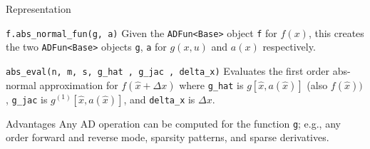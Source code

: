 \documentclass{beamer}
\begin{document}
\begin{frame}{Representation}

\begin{block}{ \texttt{f.abs\_normal\_fun(g, a)} }
Given the \texttt{ADFun<Base>} object \texttt{f} for $f(x)$,
this creates the two \texttt{ADFun<Base>} objects \texttt{g}, \texttt{a}
for $g(x, u)$ and $a(x)$ respectively.
\end{block}
\pause

\begin{block}{ \texttt{abs\_eval(n, m, s, g\_hat , g\_jac , delta\_x)} }
Evaluates the first order abs-normal approximation for
$f( \hat{x} + \Delta x )$ where
\texttt{g\_hat} is $g[ \hat{x} , a( \hat{x} ) ]$
(also $f( \hat{x} ) )$,
\texttt{g\_jac} is $g^{(1)} [ \hat{x} , a( \hat{x} ) ]$, and
\texttt{delta\_x} is $\Delta x$.
\end{block}
\pause

\begin{block}{Advantages}
Any AD operation can be computed for the function \texttt{g}; e.g.,
any order forward and reverse mode, sparsity patterns, and sparse derivatives.
\end{block}

\end{frame}
\end{document}
